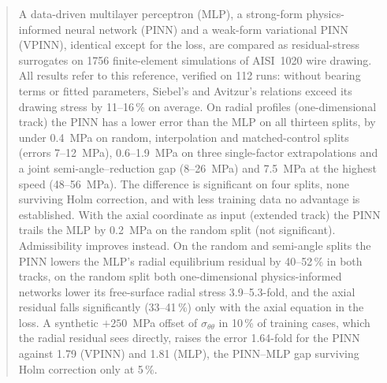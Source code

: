\documentclass[subscriptcorrection,upint,varvw,barcolor=Goldenrod3,mathalfa=cal=euler,balance,hyphenate,french,pdf-a]{asmejour} %
\begin{document}
   
\begin{abstract}
A data-driven multilayer perceptron (MLP), a strong-form physics-informed neural network (PINN) and a weak-form variational PINN (VPINN), identical except for the loss, are compared as residual-stress surrogates on 1756 finite-element simulations of AISI~1020 wire drawing. All results refer to this reference, verified on 112 runs: without bearing terms or fitted parameters, Siebel's and Avitzur's relations exceed its drawing stress by 11--16\,\% on average. On radial profiles (one-dimensional track) the PINN has a lower error than the MLP on all thirteen splits, by under 0.4~MPa on random, interpolation and matched-control splits (errors 7--12~MPa), 0.6--1.9~MPa on three single-factor extrapolations and a joint semi-angle--reduction gap (8--26~MPa) and 7.5~MPa at the highest speed (48--56~MPa). The difference is significant on four splits, none surviving Holm correction, and with less training data no advantage is established. With the axial coordinate as input (extended track) the PINN trails the MLP by 0.2~MPa on the random split (not significant). Admissibility improves instead. On the random and semi-angle splits the PINN lowers the MLP's radial equilibrium residual by 40--52\,\% in both tracks, on the random split both one-dimensional physics-informed networks lower its free-surface radial stress 3.9--5.3-fold, and the axial residual falls significantly (33--41\,\%) only with the axial equation in the loss. A synthetic $+250$~MPa offset of $\sigma_{\theta\theta}$ in 10\,\% of training cases, which the radial residual sees directly, raises the error 1.64-fold for the PINN against 1.79 (VPINN) and 1.81 (MLP), the PINN--MLP gap surviving Holm correction only at 5\,\%.
\end{abstract}


\date{}  

\maketitle %
\end{document}
